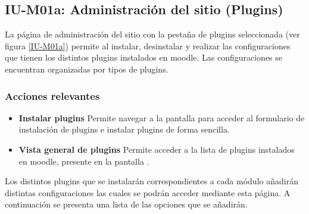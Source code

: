 \subsection{IU-M01a: Administración del sitio (Plugins)}

 La página de administración del sitio con la pestaña de plugins seleccionada (ver figura
 \ref{IU-M01a}) permite al  instalar, desinstalar y realizar las
 configuraciones que tienen los distintos plugins instalados en moodle. Las configuraciones se
 encuentran organizadas por tipos de plugins.

 
\subsubsection{Acciones relevantes}

    \begin{itemize}
    \item {\bf Instalar plugins}
        Permite navegar a la pantalla  para acceder al formulario de
        instalación de plugins e instalar plugins de forma sencilla.

    \item {\bf Vista general de plugins}
        Permite acceder a la lista de plugins instalados en moodle, presente en la pantalla
        .
    \end{itemize}

 \noindent 
 Los distintos plugins que se instalarán correspondientes a cada módulo añadirán distintas
 configuraciones las cuales se podrán acceder mediante esta página. A continuación se presenta
 una lista de las opciones que se añadirán.

